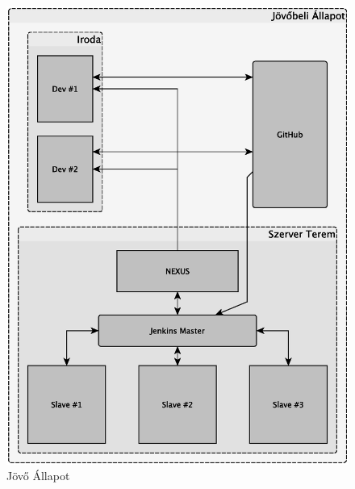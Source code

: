 \begin{figure}[h]
	\centering
	\includegraphics[width=0.7\linewidth]{figures/jovoallapot}
	\caption{Jövő Állapot}
	\label{fig:jovoallapot}
\end{figure}
